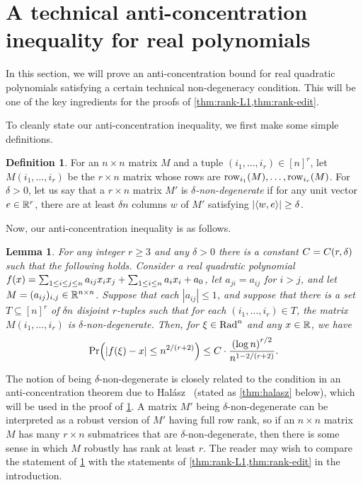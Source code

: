 \documentclass{daj}
\theoremstyle{plain}
\theoremstyle{plain}
\newtheorem{lem}[thm]{Lemma}
\theoremstyle{plain}
\theoremstyle{plain}
\theoremstyle{definition}
\newtheorem{defn}[thm]{Definition}
\theoremstyle{plain}
\theoremstyle{plain}
\theoremstyle{definition}
\theoremstyle{definition}
\theoremstyle{plain}
\let\originalleft\left
\let\originalright\right
\renewcommand{\left}{\mathopen{}\mathclose\bgroup\originalleft}
\renewcommand{\right}{\aftergroup\egroup\originalright}
\begin{document}
\section{A technical anti-concentration inequality for real polynomials\label{sec:main-lemma}}

In this section, we will prove an anti-concentration bound for real quadratic polynomials satisfying a certain technical non-degeneracy condition. This will be one of the key ingredients for the proofs of \cref{thm:rank-L1,thm:rank-edit}.

To cleanly state our anti-concentration inequality, we first make some simple definitions.

\begin{defn}\label{def:non-degenerate}
For an $n\times n$ matrix $M$ and a tuple $(i_{1},\dots,i_{r})\in[n]^r$, let $M(i_{1},\dots,i_{r})$ be the $r\times n$ matrix whose rows are $\operatorname{row}_{i_1}(M),\dots,\operatorname{row}_{i_r}(M)$. For $\delta>0$, let us say that a $r\times n$ matrix $M'$ is \emph{$\delta$-non-degenerate} if for any unit vector $e\in\mathbb{R}^{r}$, there are at least $\delta n$ columns $w$ of $M'$ satisfying $\left|\left\langle w,e\right\rangle \right|\ge\delta$.
\end{defn}

Now, our anti-concentration inequality is as follows.

\begin{lem}
\label{lem:key}For any integer $r\geq 3$ and any $\delta> 0$ there is a constant $C=C\left(r,\delta\right)$
such that the following holds. Consider a real quadratic polynomial $f\left(x\right)=\sum_{1\le i\le j\le n}a_{ij}x_{i}x_{j}+\sum_{1\le i\le n}a_{i}x_{i}+a_0$, let $a_{ji}=a_{ij}$ for $i>j$, and let $M=(a_{ij})_{i,j}\in \mathbb{R}^{n\times n}$. Suppose that each $|a_{ij}|\le 1$, and suppose
that there is a set $T\subseteq[n]^{r}$ of $\delta n$
disjoint $r$-tuples such that for each $(i_{1},\dots,i_{r})\in T$, the
matrix $M(i_{1},\dots,i_{r})$ is $\delta$-non-degenerate. Then, for $\xi\in\operatorname{Rad}^{n}$ and any $x\in\mathbb{R}$, we have
\[
\Pr\left(\left|f\left(\xi\right)-x\right|\le n^{2/\left(r+2\right)}\right)\le C\cdot\frac{\left(\log n\right)^{r/2}}{n^{1-2/\left(r+2\right)}}.
\]
\end{lem}

The notion of being $\delta$-non-degenerate is closely related to the condition in an anti-concentration theorem due to Hal\'asz~\cite{Hal77} (stated as \cref{thm:halasz} below), which will be used in the proof of \cref{lem:key}. A matrix $M'$ being $\delta$-non-degenerate can be interpreted as a robust version of $M'$ having full row rank, so if an $n\times n$ matrix $M$ has many $r\times n$ submatrices that are $\delta$-non-degenerate, then there is some sense in which $M$ robustly has rank at least $r$. The reader may wish to compare the statement of \cref{lem:key} with the statements of \cref{thm:rank-L1,thm:rank-edit} in the introduction.
\end{document}

